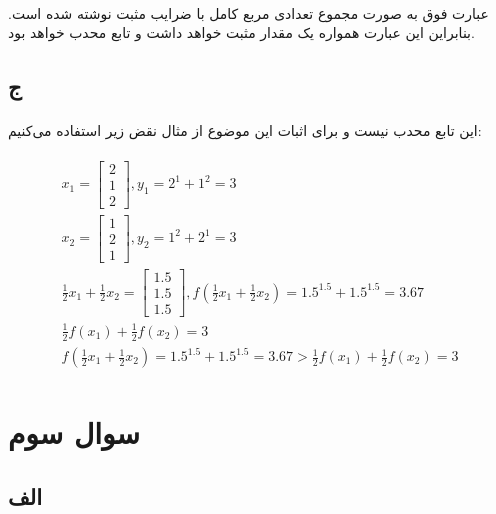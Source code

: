 \documentclass[paper=a4, fontsize=11pt]{article}
\numberwithin{equation}{section} %
\numberwithin{figure}{section} %
\numberwithin{table}{section} %
\begin{document}
\paragraph{}
عبارت فوق به صورت مجموع تعدادی مربع کامل با ضرایب مثبت نوشته شده است. بنابراین این عبارت
همواره یک مقدار مثبت خواهد داشت و تابع محدب خواهد بود.

\subsection{ج}
\paragraph{}
این تابع محدب نیست و برای اثبات این موضوع از مثال نقض زیر استفاده می‌کنیم:

\begin{align}
\begin{split}
	x_1 = \left[\begin{array}{c}
		2 \\ 1 \\ 2
	\end{array}\right],
	y_1 = 2^1 + 1^2 = 3
	\\
	x_2 = \left[\begin{array}{c}
		1 \\ 2 \\ 1
	\end{array}\right],
	y_2 = 1^2 + 2^1 = 3
	\\
	\frac{1}{2}x_1 + \frac{1}{2}x_2 =
	\left[\begin{array}{c}
		1.5 \\ 1.5 \\ 1.5
	\end{array}\right],
	f(\frac{1}{2}x_1 + \frac{1}{2}x_2) = 1.5^{1.5} + 1.5^{1.5} = 3.67
	\\
	\frac{1}{2}f(x_1) + \frac{1}{2}f(x_2) = 3
	\\
	f(\frac{1}{2}x_1 + \frac{1}{2}x_2) = 1.5^{1.5} + 1.5^{1.5} = 3.67
	>
	\frac{1}{2}f(x_1) + \frac{1}{2}f(x_2) = 3
\end{split}
\end{align}

\section{سوال سوم}
\subsection{الف}
\end{document}
